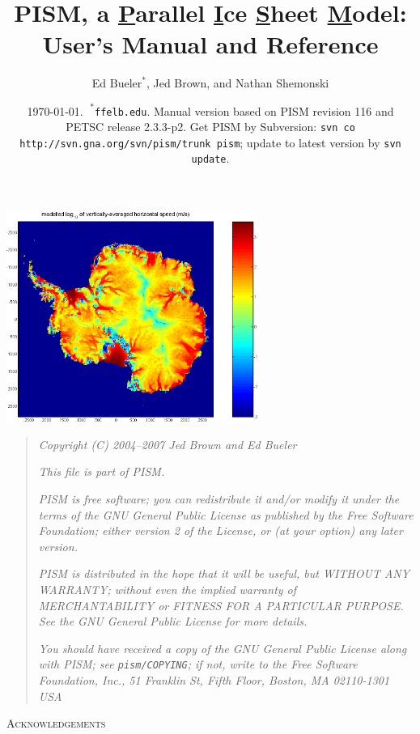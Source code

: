 \documentclass[11pt,final]{amsart}
\title[PISM User's Manual]{PISM, a \underline{P}arallel \underline{I}ce \underline{S}heet \underline{M}odel: \\ User's Manual and Reference}
\author[]{Ed $\text{Bueler}^\ast$, Jed Brown, and Nathan Shemonski}
\date{\today.  $\phantom{|}^\ast$\texttt{ffelb\@@uaf.edu}.  Manual version based on PISM revision 116 and PETSC release 2.3.3-p2.  Get PISM by Subversion: \texttt{svn co http://svn.gna.org/svn/pism/trunk pism}; update to latest version by \texttt{svn update}.}
\newcommand{\normalspacing}{\renewcommand{\baselinestretch}{1.1}\tiny\normalsize}
\newcommand{\tablespacing}{\renewcommand{\baselinestretch}{1.0}\tiny\normalsize}
\begin{document}
\maketitle
\thispagestyle{empty}

\setcounter{tocdepth}{1}
\tableofcontents

\begin{center}
\includegraphics[height=2.7in,keepaspectratio=true]{figs/ant153k_mv100_speed}
\end{center}

\newpage
\phantom{bob}
\vspace{2in}
\begin{quote}
\textsl{Copyright (C) 2004--2007 Jed Brown and Ed Bueler}
\medskip

\noindent \textsl{This file is part of PISM.}
\medskip

\noindent \textsl{PISM is free software; you can redistribute it and/or modify it under the terms of the GNU General Public License as published by the Free Software Foundation; either version 2 of the License, or (at your option) any later version.}
\medskip

\noindent \textsl{PISM is distributed in the hope that it will be useful, but WITHOUT ANY WARRANTY; without even the implied warranty of MERCHANTABILITY or FITNESS FOR A PARTICULAR PURPOSE.  See the GNU General Public License for more details.}
\medskip

\noindent \textsl{You should have received a copy of the GNU General Public License along with PISM; see \emph{\texttt{pism/COPYING}}; if not, write to the Free Software Foundation, Inc., 51 Franklin St, Fifth Floor, Boston, MA  02110-1301 USA}
\end{quote}
\vspace{1in}
\normalspacing

\centerline{\textsc{Acknowledgements}}
\bigskip
\end{document}
